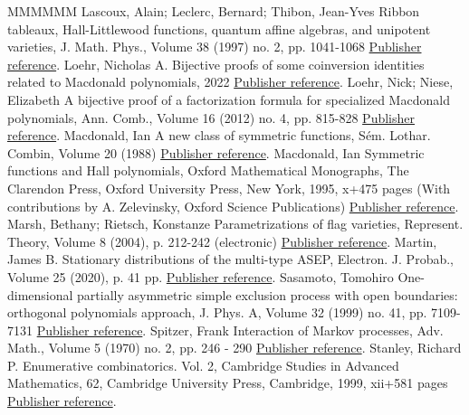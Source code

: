 \begin{thebibliography}{MMMMMM}
 Lascoux, Alain; Leclerc, Bernard; Thibon, Jean-Yves Ribbon tableaux, Hall-Littlewood functions, quantum affine algebras, and unipotent varieties, J. Math. Phys., Volume 38 (1997) no. 2, pp. 1041-1068 \href{https://alco.centre-mersenne.org/articles/10.5802/alco.248/#LLT}{Publisher reference}.
 Loehr, Nicholas A. Bijective proofs of some coinversion identities related to Macdonald polynomials, 2022 \href{https://alco.centre-mersenne.org/articles/10.5802/alco.248/#Loehr}{Publisher reference}.
 Loehr, Nick; Niese, Elizabeth A bijective proof of a factorization formula for specialized Macdonald polynomials, Ann. Comb., Volume 16 (2012) no. 4, pp. 815-828 \href{https://alco.centre-mersenne.org/articles/10.5802/alco.248/#LoehrNiese}{Publisher reference}.
 Macdonald, Ian A new class of symmetric functions, Sém. Lothar. Combin, Volume 20 (1988) \href{https://alco.centre-mersenne.org/articles/10.5802/alco.248/#Mac88}{Publisher reference}.
 Macdonald, Ian Symmetric functions and Hall polynomials, Oxford Mathematical Monographs, The Clarendon Press, Oxford University Press, New York, 1995, x+475 pages (With contributions by A. Zelevinsky, Oxford Science Publications) \href{https://alco.centre-mersenne.org/articles/10.5802/alco.248/#Macdonald}{Publisher reference}.
 Marsh, Bethany; Rietsch, Konstanze Parametrizations of flag varieties, Represent. Theory, Volume 8 (2004), p. 212-242 (electronic) \href{https://alco.centre-mersenne.org/articles/10.5802/alco.248/#MarshRietsch}{Publisher reference}.
 Martin, James B. Stationary distributions of the multi-type ASEP, Electron. J. Probab., Volume 25 (2020), p. 41 pp. \href{https://alco.centre-mersenne.org/articles/10.5802/alco.248/#martin-2020}{Publisher reference}.
 Sasamoto, Tomohiro One-dimensional partially asymmetric simple exclusion process with open boundaries: orthogonal polynomials approach, J. Phys. A, Volume 32 (1999) no. 41, pp. 7109-7131 \href{https://alco.centre-mersenne.org/articles/10.5802/alco.248/#sasamoto-1999}{Publisher reference}.
 Spitzer, Frank Interaction of Markov processes, Adv. Math., Volume 5 (1970) no. 2, pp. 246 - 290 \href{https://alco.centre-mersenne.org/articles/10.5802/alco.248/#spitzer-1970}{Publisher reference}.
 Stanley, Richard P. Enumerative combinatorics. Vol. 2, Cambridge Studies in Advanced Mathematics, 62, Cambridge University Press, Cambridge, 1999, xii+581 pages \href{https://alco.centre-mersenne.org/articles/10.5802/alco.248/#stanley-ec2}{Publisher reference}.

\end{thebibliography}
